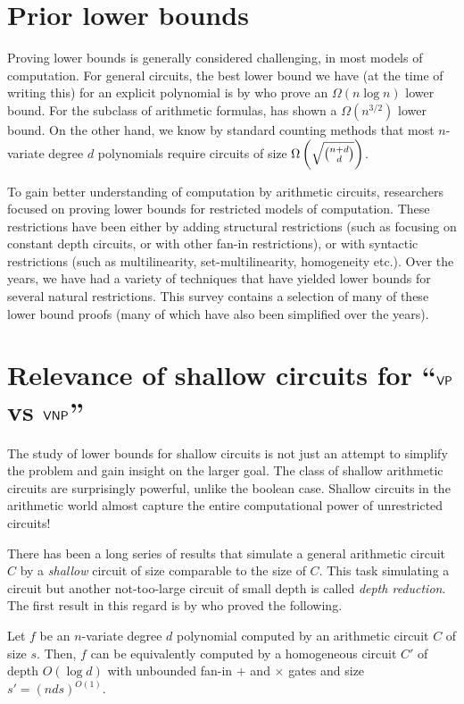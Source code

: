\section{Prior lower bounds}

Proving lower bounds is generally considered challenging, in most models of computation. 
For general circuits, the best lower bound we have (at the time of writing this) for an explicit polynomial is by \cite{BS83} who prove an $\Omega(n\log n)$ lower bound. 
For the subclass of arithmetic formulas, \cite{k85} has shown a $\Omega(n^{3/2})$ lower bound. 
On the other hand, we know by standard counting methods that most $n$-variate degree $d$ polynomials require circuits of size $\Omega\left(\sqrt{\binom{n+d}{d}}\right)$.

To gain better understanding of computation by arithmetic circuits, researchers focused on proving lower bounds for restricted models of computation. These restrictions have been either by adding structural restrictions (such as focusing on constant depth circuits, or with other fan-in restrictions), or with syntactic restrictions (such as multilinearity, set-multilinearity, homogeneity etc.). 
Over the years, we have had a variety of techniques that have yielded lower bounds for several natural restrictions. 
This survey contains a selection of many of these lower bound proofs (many of which have also been simplified over the years). 

\section{Relevance of shallow circuits for ``$\mathsf{VP}$ vs $\mathsf{VNP}$''}

The study of lower bounds for shallow circuits is not just an attempt to simplify the problem and gain insight on the larger goal. 
The class of shallow arithmetic circuits are surprisingly powerful, unlike the boolean case. 
Shallow circuits in the arithmetic world almost capture the entire computational power of unrestricted circuits! 

There has been a long series of results that simulate a general arithmetic circuit $C$ by a \emph{shallow} circuit of size comparable to the size of $C$. 
This task simulating a circuit but another not-too-large circuit of small depth is called \emph{depth reduction}. 
The first result in this regard is by \cite{vsbr83} who proved the following. 

\begin{theorem}
Let $f$ be an $n$-variate degree $d$ polynomial computed by an arithmetic circuit $C$ of size $s$. 
Then, $f$ can be equivalently computed by a homogeneous circuit $C'$ of depth $O(\log d)$ with unbounded fan-in $+$ and $\times$ gates and size $s' = (nds)^{O(1)}$. 
\end{theorem}

